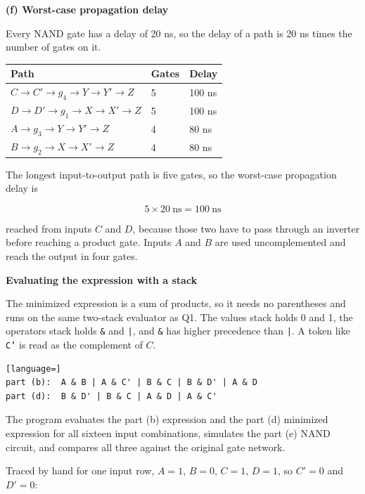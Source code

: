 \documentclass[11pt]{article}
\begin{document}
\textbf{(f) Worst-case propagation delay}

Every NAND gate has a delay of 20 ns, so the delay of a path is 20 ns times the
number of gates on it.

\begin{tabular}{lll}
Path & Gates & Delay \\[2pt]
\hline
$C \rightarrow C' \rightarrow g_4 \rightarrow Y \rightarrow Y' \rightarrow Z$ & 5 & 100 ns \\
$D \rightarrow D' \rightarrow g_1 \rightarrow X \rightarrow X' \rightarrow Z$ & 5 & 100 ns \\
$A \rightarrow g_3 \rightarrow Y \rightarrow Y' \rightarrow Z$ & 4 & 80 ns \\
$B \rightarrow g_2 \rightarrow X \rightarrow X' \rightarrow Z$ & 4 & 80 ns \\
\end{tabular}

The longest input-to-output path is five gates, so the worst-case propagation delay is

\[ 5 \times 20\ \text{ns} = 100\ \text{ns} \]

reached from inputs $C$ and $D$, because those two have to pass through an inverter before
reaching a product gate. Inputs $A$ and $B$ are used uncomplemented and reach the output in
four gates.

\newpage
\textbf{Evaluating the expression with a stack}

The minimized expression is a sum of products, so it needs no parentheses and runs on the
same two-stack evaluator as Q1. The values stack holds 0 and 1, the operators stack holds
\texttt{\&} and \texttt{|}, and \texttt{\&} has higher precedence than \texttt{|}. A token
like \texttt{C'} is read as the complement of $C$.

\begin{lstlisting}[language=]
part (b):  A & B | A & C' | B & C | B & D' | A & D
part (d):  B & D' | B & C | A & D | A & C'
\end{lstlisting}

The program evaluates the part (b) expression and the part (d) minimized expression for all
sixteen input combinations, simulates the part (e) NAND circuit, and compares all three
against the original gate network.

Traced by hand for one input row, $A=1$, $B=0$, $C=1$, $D=1$, so $C'=0$ and $D'=0$:
\end{document}
